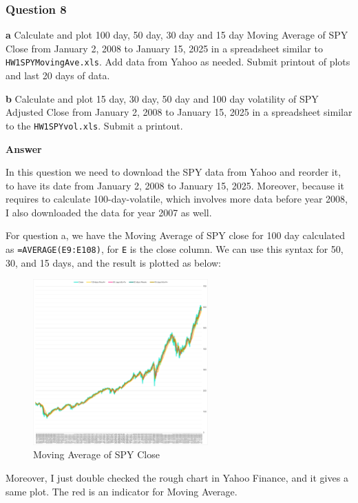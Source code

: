\documentclass[margin=1in]{article}
\begin{document}
	   \pagebreak
		   
		   \subsubsection*{Question 8}
		   
		   \textbf{a} Calculate and plot 100 day, 50 day, 30 day and 15 day Moving Average of SPY Close from January 2, 2008 to January 15, 2025 in a spreadsheet similar to \texttt{HW1SPYMovingAve.xls}. Add data from Yahoo as needed. Submit printout of plots and last 20 days of data. 
		   
		   \textbf{b} Calculate and plot 15 day, 30 day, 50 day and 100 day volatility of SPY Adjusted Close from January 2, 2008 to January 15, 2025 in a spreadsheet similar to the \texttt{HW1SPYvol.xls}. Submit a printout.
		   
		   \textbf{Answer}
		   
		   In this question we need to download the SPY data from Yahoo and reorder it, to have its date from January 2, 2008 to January 15, 2025. Moreover, because it requires to calculate 100-day-volatile, which involves more data before year 2008, I also downloaded the data for year 2007 as well. 
		   
		   For question a, we have the Moving Average of SPY close for 100 day calculated as \texttt{=AVERAGE(E9:E108)}, for \texttt{E} is the close column. We can use this syntax for 50, 30, and 15 days, and the result is plotted as below:
		   \begin{figure}[h]
		   	\caption{Moving Average of SPY Close}
		   	\centering
		   	\includegraphics[width=0.6\textwidth]{HW1_Q8_1}
		   \end{figure}
	   
	   Moreover, I just double checked the rough chart in Yahoo Finance, and it gives a same plot. The red is an indicator for Moving Average.
	   
\end{document}
